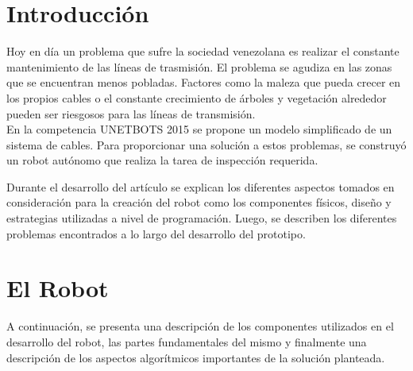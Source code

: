 \documentclass[conference]{IEEEtran}
\begin{document}




%
\IEEEpeerreviewmaketitle

\bigskip

\section{Introducci\'{o}n}

\bigskip


Hoy en día un problema que sufre la sociedad venezolana es realizar el constante mantenimiento de las líneas de trasmisión. El problema se agudiza en las zonas que se encuentran menos pobladas. Factores como la maleza que pueda crecer en los propios cables o el constante crecimiento de árboles y vegetación alrededor pueden ser riesgosos para las líneas de transmisión. \\

En la competencia UNETBOTS 2015 se propone un modelo simplificado de un sistema de cables. Para proporcionar una solución a estos problemas, se construyó un robot autónomo que realiza la tarea de inspección requerida.

\bigskip
Durante el desarrollo del artículo se explican los diferentes aspectos tomados en consideración para la creación del robot como los componentes físicos, diseño y estrategias utilizadas a nivel de programación. Luego, se describen los diferentes problemas encontrados a lo largo del desarrollo del prototipo. 

\bigskip

\section{El Robot}

\bigskip

A continuación, se presenta una descripción de los componentes
utilizados en el desarrollo del robot, las partes fundamentales
del mismo y finalmente una descripción de los aspectos algorítmicos
importantes de la solución planteada.
\end{document}
